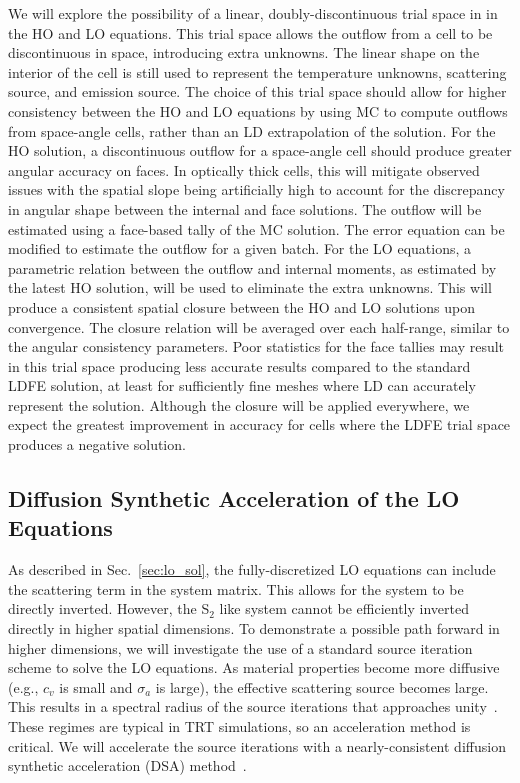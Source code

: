 \documentclass[11pt]{article}
\begin{document}
We will explore the possibility of a linear, doubly-discontinuous trial space in
in the HO and LO equations. This trial space allows
the outflow from a cell to be discontinuous in space, introducing extra unknowns. The
linear shape on the interior of the cell is still used to represent the temperature
unknowns, scattering source, and emission source.  The choice of this 
trial space should allow for higher consistency between the HO and LO
equations by using MC to compute outflows from space-angle cells, rather than an LD
extrapolation of the solution.    For the HO solution, a discontinuous outflow for a space-angle cell should produce greater
angular accuracy on faces.  In optically thick cells, this will mitigate observed issues with the spatial slope being
artificially high to account for the discrepancy in angular shape between the
internal and face solutions. The outflow will be estimated using a
face-based tally of the MC solution.  The error equation can be modified to estimate the outflow for a given batch. 
For the LO equations, a parametric relation between the outflow and internal moments, as
estimated by the latest HO solution,
will be used to eliminate the extra  unknowns.  This will produce a consistent spatial closure between the HO and LO
solutions upon convergence. The closure relation will be averaged
over each half-range, similar to the angular consistency parameters.   Poor statistics for the face tallies may result in this trial space producing less
accurate results compared to the standard LDFE solution, at least for sufficiently fine meshes where LD
can accurately represent the solution.  Although the closure will be applied everywhere,
we expect the greatest improvement in accuracy for cells where the LDFE trial space
produces a negative solution.

\subsection{Diffusion Synthetic Acceleration of the LO Equations}

As described in Sec.~\ref{sec:lo_sol}, the fully-discretized LO equations can include
the scattering term in the system matrix.  This allows for the system to be directly
inverted.
However, the S$_2$ like system cannot be efficiently inverted
directly in higher spatial dimensions.  To demonstrate a possible path forward in
higher dimensions, we will investigate the use of a standard
source iteration scheme to solve the LO equations.  As
material properties become more diffusive (e.g., $c_v$ is small and $\sigma_a$ is
large), the effective scattering source becomes large.  This results in a spectral radius of the source iterations that approaches
unity~\cite{morel_newton}.  These regimes are typical in TRT simulations, so an
acceleration method is critical.  We will accelerate the source iterations with a nearly-consistent diffusion synthetic acceleration
(DSA) method~\cite{wla,wla_thesis}.
\end{document}
